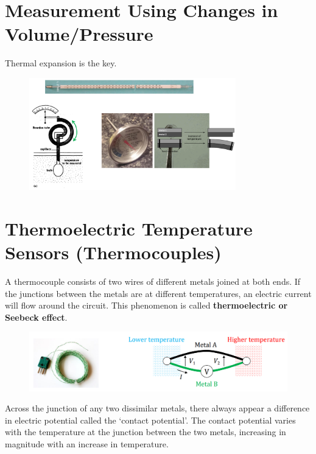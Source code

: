 \documentclass[class=report, crop=false, 12pt,a4paper]{standalone}
\begin{document}
\section{Measurement Using Changes in Volume/Pressure}
Thermal expansion is the key.
\begin{figure}[H]
  \centering
  \includegraphics[width = 0.8\textwidth]{../img/Mdiagram60.png}
\end{figure}
\section{Thermoelectric Temperature Sensors (Thermocouples)}
A thermocouple consists of two wires of different metals joined at both ends. If the junctions between the metals are at different temperatures, an electric current will flow around the circuit. This phenomenon is called \textbf{thermoelectric or Seebeck effect}.
\begin{figure}[H]
  \centering
  \includegraphics[width = 1\textwidth]{../img/Mdiagram61.png}
\end{figure}
Across the junction of any two dissimilar metals, there always appear a difference in electric potential called the ‘contact potential’. The contact potential varies with the temperature at the junction between the two metals, increasing in magnitude with an increase in temperature.
\end{document}
